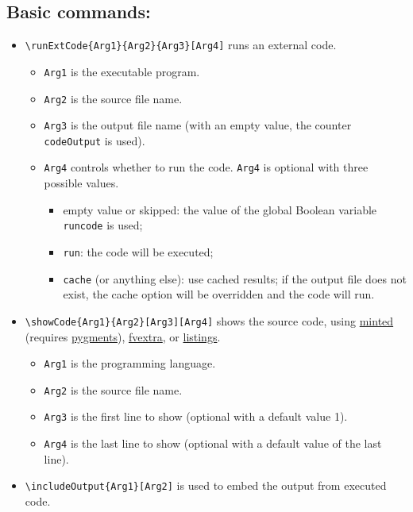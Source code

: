 \documentclass{ltxdoc}
\begin{document}
\subsection{Basic commands:}
\label{sec:org496679c}
\begin{itemize}
\item \texttt{\textbackslash{}runExtCode\{Arg1\}\{Arg2\}\{Arg3\}[Arg4]} runs an external code.

\begin{itemize}
\item \texttt{Arg1} is the executable program.
\item \texttt{Arg2} is the source file name.
\item \texttt{Arg3} is the output file name (with an empty value, the counter \texttt{codeOutput} is
used).
\item \texttt{Arg4} controls whether to run the code. \texttt{Arg4} is optional with three possible
values.
\begin{itemize}
\item empty value or skipped: the value of the global Boolean variable \texttt{runcode}
is used;
\item \texttt{run}: the code will be executed;
\item \texttt{cache} (or anything else): use cached results; if the output file does not
exist, the cache option will be overridden and the code will run.
\end{itemize}
\end{itemize}

\item \texttt{\textbackslash{}showCode\{Arg1\}\{Arg2\}[Arg3][Arg4]} shows the source code, using
\href{https://ctan.org/pkg/minted}{minted} (requires \href{https://pygments.org/}{pygments}), \href{https://ctan.org/pkg/fvextra}{fvextra}, or \href{https://ctan.org/pkg/listings?lang=en}{listings}.

\begin{itemize}
\item \texttt{Arg1} is the programming language.
\item \texttt{Arg2} is the source file name.
\item \texttt{Arg3} is the first line to show (optional with a default value 1).
\item \texttt{Arg4} is the last line to show (optional with a default value of
the last line).
\end{itemize}

\item \texttt{\textbackslash{}includeOutput\{Arg1\}[Arg2]} is used to embed the output from executed
code.


\end{itemize}
\end{document}
